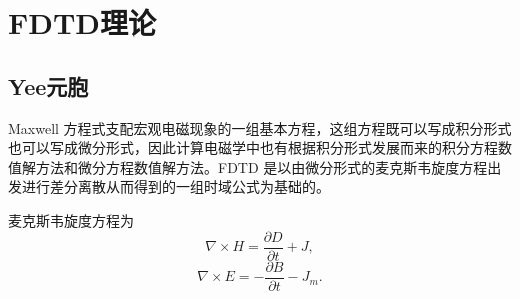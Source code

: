 
\chapter{FDTD理论}
\section{Yee元胞}
Maxwell 方程式支配宏观电磁现象的一组基本方程，这组方程既可以写成积分形式也可以写成微分形式，因此计算电磁学中也有根据积分形式发展而来的积分方程数值解方法和微分方程数值解方法。FDTD 是以由微分形式的麦克斯韦旋度方程出发进行差分离散从而得到的一组时域公式为基础的。

麦克斯韦旋度方程为
\begin{equation}\label{maxwellH}
\nabla\times\mathbf{\mathit{H}}=\frac{\partial \mathbb{\mathit{D}}}{\partial t}+\mathbf{\mathit{J}},
\end{equation}
\begin{equation}\label{maxwellE}
\nabla\times\mathbf{\mathit{E}}=-\frac{\partial \mathbb{\mathit{B}}}{\partial t}-\mathbf{\mathit{J}}_m.
\end{equation}


